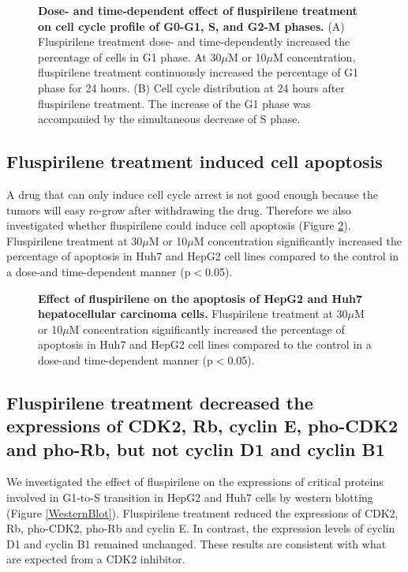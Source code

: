 \documentclass[10pt,letterpaper]{article}
\begin{document}
\begin{figure}%
\caption{{\bf Dose- and time-dependent effect of fluspirilene treatment on cell cycle profile of G0-G1, S, and G2-M phases.} (A) Fluspirilene treatment dose- and time-dependently increased the percentage of cells in G1 phase. At 30$\mu$M or 10$\mu$M concentration, fluspirilene treatment continuously increased the percentage of G1 phase for 24 hours. (B) Cell cycle distribution at 24 hours after fluspirilene treatment. The increase of the G1 phase was accompanied by the simultaneous decrease of S phase.}
\label{CellCycle}
\end{figure}

\subsection*{Fluspirilene treatment induced cell apoptosis}

A drug that can only induce cell cycle arrest is not good enough because the tumors will easy re-grow after withdrawing the drug. Therefore we also investigated whether fluspirilene could induce cell apoptosis (Figure \ref{CellApoptosis}). Fluspirilene treatment at 30$\mu$M or 10$\mu$M concentration significantly increased the percentage of apoptosis in Huh7 and HepG2 cell lines compared to the control in a dose-and time-dependent manner (p$<$0.05).

\begin{figure}%
\caption{{\bf Effect of fluspirilene on the apoptosis of HepG2 and Huh7 hepatocellular carcinoma cells.} Fluspirilene treatment at 30$\mu$M or 10$\mu$M concentration significantly increased the percentage of apoptosis in Huh7 and HepG2 cell lines compared to the control in a dose-and time-dependent manner (p$<$0.05).}
\label{CellApoptosis}
\end{figure}

\subsection*{Fluspirilene treatment decreased the expressions of CDK2, Rb, cyclin E, pho-CDK2 and pho-Rb, but not cyclin D1 and cyclin B1}

We investigated the effect of fluspirilene on the expressions of critical proteins involved in G1-to-S transition in HepG2 and Huh7 cells by western blotting (Figure \ref{WesternBlot}). Fluspirilene treatment reduced the expressions of CDK2, Rb, pho-CDK2, pho-Rb and cyclin E. In contrast, the expression levels of cyclin D1 and cyclin B1 remained unchanged. These results are consistent with what are expected from a CDK2 inhibitor.
\end{document}
